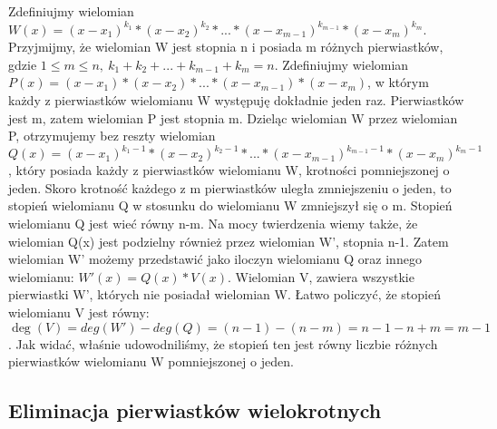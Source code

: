 \documentclass[twoside,a4paper]{book}
\newenvironment{proof}[1][Dowód]{\begin{trivlist}
\item[\hskip \labelsep {\bfseries #1}]}{\end{trivlist}}
\begin{document}
\begin{proof}
	Zdefiniujmy wielomian $W(x)=(x-x_1)^{k_1}*(x-x_2)^{k_2}*...*(x-x_{m-1})^{k_{m-1}}*(x-x_m)^{k_m}$. Przyjmijmy, że wielomian W jest stopnia n i posiada m różnych pierwiastków, gdzie $1\le m\le n,\ k_1+k_2+...+k_{m-1}+k_m=n$. Zdefiniujmy wielomian $P(x)=(x-x_1)*(x-x_2)*...*(x-x_{m-1})*(x-x_m)$, w którym każdy z pierwiastków wielomianu W występuję dokładnie jeden raz. Pierwiastków jest m, zatem wielomian P jest stopnia m. Dzieląc wielomian W przez wielomian P, otrzymujemy bez reszty wielomian $Q(x)=(x-x_1)^{k_1-1}*(x-x_2)^{k_2-1}*...*(x-x_{m-1})^{k_{m-1}-1}*(x-x_m)^{k_m-1}$, który posiada każdy z pierwiastków wielomianu W, krotności pomniejszonej o jeden. Skoro krotność każdego z m pierwiastków uległa zmniejszeniu o jeden, to stopień wielomianu Q w stosunku do wielomianu W zmniejszył się o m. Stopień wielomianu Q jest wieć równy n-m.
	Na mocy twierdzenia wiemy także, że wielomian Q(x) jest podzielny również przez wielomian W', stopnia n-1. Zatem wielomian W' możemy przedstawić jako iloczyn wielomianu Q oraz innego wielomianu: $W'(x)=Q(x)*V(x)$. Wielomian V, zawiera wszystkie pierwiastki W', których nie posiadał wielomian W. Łatwo policzyć, że stopień wielomianu V jest równy: $\deg(V)=deg(W')-deg(Q)=(n-1)-(n-m)=n-1-n+m=m-1$. Jak widać, właśnie udowodniliśmy, że stopień ten jest równy liczbie różnych pierwiastków wielomianu W pomniejszonej o jeden.
\end{proof}

\subsection{Eliminacja pierwiastków wielokrotnych}
\end{document}
